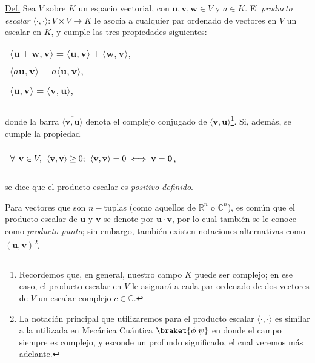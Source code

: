 \begin{tcolorbox}
\underline{Def.} Sea $V$ sobre $K$ un espacio vectorial, con $\mathbf{u},\mathbf{v},\mathbf{w}\in V$ y $a\in K$. El \textit{producto escalar} $\langle\cdot\mathop ,\cdot\rangle:V\times V\rightarrow K$ le asocia a cualquier par ordenado de vectores en $V$ un escalar en $K$, y cumple las tres propiedades siguientes:

\begin{tabular}{l}
    \\
    $\langle\mathbf{u}+\mathbf{w},\mathbf{v}\rangle = \langle\mathbf{u},\mathbf{v}\rangle+\langle\mathbf{w},\mathbf{v}\rangle,$ \\ \\ $\langle a\mathbf{u},\mathbf{v}\rangle = a\langle\mathbf{u},\mathbf{v}\rangle,$ \\ \\
    $\langle\mathbf{u},\mathbf{v}\rangle=\overline{\langle\mathbf{v},\mathbf{u}\rangle},$ \\ \\
\end{tabular}

donde la barra $\overline{\langle\mathbf{v},\mathbf{u}\rangle}$ denota el complejo conjugado de $\langle\mathbf{v},\mathbf{u}\rangle$\footnote{Recordemos que, en general, nuestro campo $K$ puede ser complejo; en ese caso, el producto escalar en $V$ le asignará a cada par ordenado de dos vectores de $V$ un escalar complejo $c\in\mathbb{C}$.}. Si, además, se cumple la propiedad

\begin{tabular}{l}
    \\
    $\forall\hspace{1.5mm}\mathbf{v}\in V, \hspace{1.5mm} \langle\mathbf{v},\mathbf{v}\rangle\geq0; \hspace{1.5mm} \langle\mathbf{v},\mathbf{v}\rangle = 0 \iff \mathbf{v}=\mathbf{0}$, \\ \\
\end{tabular}

se dice que el producto escalar es \textit{positivo definido}.

\vspace{3mm}
\hspace{2.5mm} Para vectores que son $n-$tuplas (como aquellos de $\mathbb{R}^n$ o $\mathbb{C}^n$), es común que el producto escalar de $\mathbf{u}$ y $\mathbf{v}$ se denote por $\mathbf{u}\cdot\mathbf{v}$, por lo cual también se le conoce como \textit{producto punto}; sin embargo, también existen notaciones alternativas como $(\mathbf{u}, \mathbf{v})$\footnote{La notación principal que utilizaremos para el producto escalar $\langle \cdot,\cdot\rangle$ es similar a la utilizada en Mecánica Cuántica $\braket{\phi|\psi}$ \textemdash en donde el campo siempre es complejo\textemdash, y esconde un profundo significado, el cual veremos más adelante.}.

\end{tcolorbox}{}

